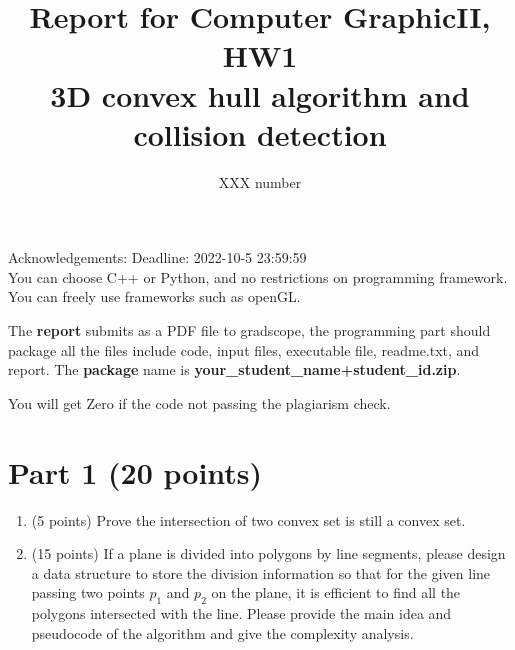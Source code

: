 \documentclass[]{article}
\title{Report for Computer GraphicII, HW1 \\ 3D convex hull algorithm and collision detection}
\author{XXX number}
\begin{document}
\maketitle
Acknowledgements:
Deadline: 2022-10-5 23:59:59
\\

You can choose C++ or Python, and no restrictions on programming framework. You can freely use frameworks such as openGL.

The \textbf{report} submits as a PDF file to gradscope, the programming part should package all the files include code, input files, executable file, readme.txt, and report. The \textbf{package} name is  \textbf{your\_student\_name+student\_id.zip}.

You will get Zero if the code not passing the plagiarism check.
\newpage
\section{Part 1 (20 points)}
\begin{enumerate}
\item  (5 points) Prove the intersection of two convex set is still a convex set.


\item  (15 points) If a plane is divided into polygons by line segments, please design a data structure to store the division information so that for the given line passing two points  $p_1$ and $p_2$ on the plane, it is efficient to find all the polygons intersected with the line. Please provide the main idea and pseudocode of the algorithm and give the complexity analysis.


\end{enumerate}

\newpage
\end{document}

